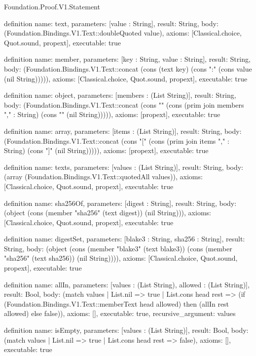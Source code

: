 \begin{lexlean}{Foundation.Proof.V1.Statement}
\begin{semanticmodule}
definition{
  name: text,
  parameters: [value : String],
  result: String,
  body: (Foundation.Bindings.V1.Text::doubleQuoted value),
  axioms: [Classical.choice, Quot.sound, propext],
  executable: true
}

definition{
  name: member,
  parameters: [key : String, value : String],
  result: String,
  body: (Foundation.Bindings.V1.Text::concat (cons (text key) (cons ":" (cons value (nil String))))),
  axioms: [Classical.choice, Quot.sound, propext],
  executable: true
}

definition{
  name: object,
  parameters: [members : (List String)],
  result: String,
  body: (Foundation.Bindings.V1.Text::concat (cons "{" (cons (prim join members "," : String) (cons "}" (nil String))))),
  axioms: [propext],
  executable: true
}

definition{
  name: array,
  parameters: [items : (List String)],
  result: String,
  body: (Foundation.Bindings.V1.Text::concat (cons "[" (cons (prim join items "," : String) (cons "]" (nil String))))),
  axioms: [propext],
  executable: true
}

definition{
  name: texts,
  parameters: [values : (List String)],
  result: String,
  body: (array (Foundation.Bindings.V1.Text::quotedAll values)),
  axioms: [Classical.choice, Quot.sound, propext],
  executable: true
}

definition{
  name: sha256Of,
  parameters: [digest : String],
  result: String,
  body: (object (cons (member "sha256" (text digest)) (nil String))),
  axioms: [Classical.choice, Quot.sound, propext],
  executable: true
}

definition{
  name: digestSet,
  parameters: [blake3 : String, sha256 : String],
  result: String,
  body: (object (cons (member "blake3" (text blake3)) (cons (member "sha256" (text sha256)) (nil String)))),
  axioms: [Classical.choice, Quot.sound, propext],
  executable: true
}

definition{
  name: allIn,
  parameters: [values : (List String), allowed : (List String)],
  result: Bool,
  body: (match values
    | List.nil => true
    | List.cons head rest => (if (Foundation.Bindings.V1.Text::memberText head allowed) then (allIn rest allowed) else false)),
  axioms: [],
  executable: true,
  recursive_argument: values
}

definition{
  name: isEmpty,
  parameters: [values : (List String)],
  result: Bool,
  body: (match values | List.nil => true | List.cons head rest => false),
  axioms: [],
  executable: true
}


\end{semanticmodule}
\end{lexlean}
